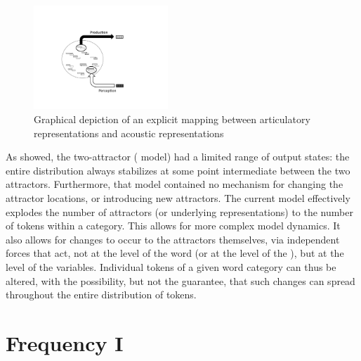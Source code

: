 \begin{figure}[H]

\includegraphics[width=0.45\textwidth]{figures/SeparateReps.pdf}\caption{\label{fig:P-toP-mapping}Graphical depiction of an explicit mapping
between articulatory representations and acoustic representations}

\end{figure}

As  showed, the two-attractor (
model) had a limited range of output states: the entire distribution
always stabilizes at some point intermediate between the two attractors.
Furthermore, that model contained no mechanism for changing the attractor
locations, or introducing new attractors. The current model effectively
explodes the number of attractors (or underlying representations)
to the number of tokens within a category. This allows for more complex
model dynamics. It also allows for changes to occur to the attractors
themselves, via independent forces that act, not at the level of the
word (or at the level of the ), but at the level of the 
variables. Individual tokens of a given word category can thus be
altered, with the possibility, but not the guarantee, that such changes
can spread throughout the entire distribution of tokens.

\section{\label{sec:Frequency-I}Frequency I}

